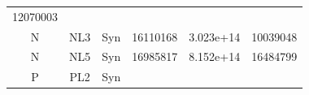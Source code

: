 \documentclass[]{article}
\begin{document}
\begin{longtable}[]{@{}cccccc@{}}
\begin{minipage}[t]{0.12\columnwidth}
12070003
\strut\end{minipage}\tabularnewline
\begin{minipage}[t]{0.07\columnwidth}\centering\strut
N
\strut\end{minipage} &
\begin{minipage}[t]{0.07\columnwidth}\centering\strut
NL3
\strut\end{minipage} &
\begin{minipage}[t]{0.12\columnwidth}\centering\strut
Syn
\strut\end{minipage} &
\begin{minipage}[t]{0.12\columnwidth}\centering\strut
16110168
\strut\end{minipage} &
\begin{minipage}[t]{0.12\columnwidth}\centering\strut
3.023e+14
\strut\end{minipage} &
\begin{minipage}[t]{0.12\columnwidth}\centering\strut
10039048
\strut\end{minipage}\tabularnewline
\begin{minipage}[t]{0.07\columnwidth}\centering\strut
N
\strut\end{minipage} &
\begin{minipage}[t]{0.07\columnwidth}\centering\strut
NL5
\strut\end{minipage} &
\begin{minipage}[t]{0.12\columnwidth}\centering\strut
Syn
\strut\end{minipage} &
\begin{minipage}[t]{0.12\columnwidth}\centering\strut
16985817
\strut\end{minipage} &
\begin{minipage}[t]{0.12\columnwidth}\centering\strut
8.152e+14
\strut\end{minipage} &
\begin{minipage}[t]{0.12\columnwidth}\centering\strut
16484799
\strut\end{minipage}\tabularnewline
\begin{minipage}[t]{0.07\columnwidth}\centering\strut
P
\strut\end{minipage} &
\begin{minipage}[t]{0.07\columnwidth}\centering\strut
PL2
\strut\end{minipage} &
\begin{minipage}[t]{0.12\columnwidth}\centering\strut
Syn
\strut\end{minipage} &
\begin{minipage}[t]{0.12\columnwidth}\centering\strut

\end{minipage}
\end{longtable}
\end{document}
